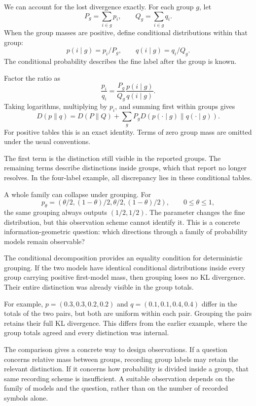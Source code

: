 \documentclass[11pt,oneside,openany]{book}
\theoremstyle{definition}
\theoremstyle{remark}
\numberwithin{equation}{chapter}
\begin{document}
We can account for the lost divergence exactly. For each group \(g\), let \[P_g=\sum_{i\in g}p_i,\qquad Q_g=\sum_{i\in g}q_i.\] When the group masses are positive, define conditional distributions within that group: \[p(i\mid g)=p_i/P_g,\qquad q(i\mid g)=q_i/Q_g.\] The conditional probability describes the fine label after the group is known.

Factor the ratio as \[\frac{p_i}{q_i}=\frac{P_g}{Q_g}
\frac{p(i\mid g)}{q(i\mid g)}.\] Taking logarithms, multiplying by \(p_i\), and summing first within groups gives \[\boxed{
D(p\|q)=D(P\|Q)+\sum_g P_gD(p(\cdot\mid g)\|q(\cdot\mid g)).
}\] For positive tables this is an exact identity. Terms of zero group mass are omitted under the usual conventions.

The first term is the distinction still visible in the reported groups. The remaining terms describe distinctions inside groups, which that report no longer resolves. In the four-label example, all discrepancy lies in these conditional tables.

A whole family can collapse under grouping. For \[p_\theta=(\theta/2,(1-\theta)/2,\theta/2,(1-\theta)/2),
\qquad 0\leq\theta\leq1,\] the same grouping always outputs \((1/2,1/2)\). The parameter changes the fine distribution, but this observation scheme cannot identify it. This is a concrete information-geometric question: which directions through a family of probability models remain observable?

The conditional decomposition provides an equality condition for deterministic grouping. If the two models have identical conditional distributions inside every group carrying positive first-model mass, then grouping loses no KL divergence. Their entire distinction was already visible in the group totals.

For example, \(p=(0.3,0.3,0.2,0.2)\) and \(q=(0.1,0.1,0.4,0.4)\) differ in the totals of the two pairs, but both are uniform within each pair. Grouping the pairs retains their full KL divergence. This differs from the earlier example, where the group totals agreed and every distinction was internal.

The comparison gives a concrete way to design observations. If a question concerns relative mass between groups, recording group labels may retain the relevant distinction. If it concerns how probability is divided inside a group, that same recording scheme is insufficient. A suitable observation depends on the family of models and the question, rather than on the number of recorded symbols alone.
\end{document}
